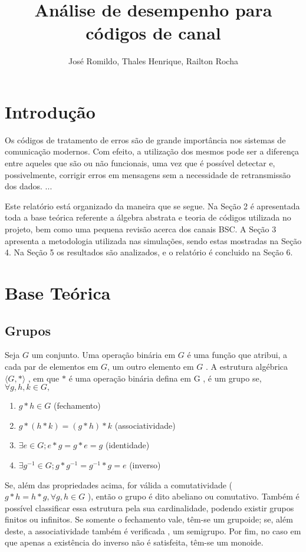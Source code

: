 \documentclass[]{article}
\title{ An{\'a}lise de desempenho para c{\'o}digos de canal}
\author{Jos{\'e} Romildo, Thales Henrique, Railton Rocha}
\begin{document}
\maketitle

\section{Introdução}

\par
Os códigos de tratamento de erros são de grande importância nos sistemas de comunicação modernos. Com efeito, a utilização dos mesmos pode ser a diferença entre aqueles que são ou não funcionais, uma vez que é possível detectar e, possivelmente, corrigir erros em mensagens sem a necessidade de retransmissão dos dados. 
...

Este relatório está organizado da maneira que se segue. Na Seção 2 é apresentada toda a base teórica referente a álgebra abstrata e teoria de códigos utilizada no projeto, bem como uma pequena revisão acerca dos canais BSC. A Seção 3 apresenta a metodologia utilizada nas simulações, sendo estas mostradas na Seção 4. Na Seção 5 os resultados são analizados, e o relatório é concluido na Seção 6.



\section{Base Teórica}
\subsection{Grupos}

Seja $G$ um conjunto. Uma operação binária em $G$ é uma função que atribui, a cada par de elementos em $G$, um outro elemento em $G$ . A estrutura algébrica  $\langle G , * \rangle$ , em que $*$ é uma operação binária defina em G , é um grupo se, $\forall g , h , k \in G,$

\begin{enumerate}[G1.]
	\item $g * h \in G$ (fechamento)
	\item $ g * (h * k) = (g*h)*k$ (associatividade)
	\item $ \exists e \in G ; e * g = g * e = g $ (identidade)
	\item $ \exists g^{-1} \in G;  g*g^{-1} = g^{-1} *g=e $ (inverso)
\end{enumerate}

Se, além das propriedades acima, for válida a comutatividade ( $ g*h = h*g , \forall g , h \in G$ ), então o grupo é dito abeliano ou comutativo. Também é possível classificar essa estrutura pela sua cardinalidade, podendo existir grupos finitos ou infinitos.
Se somente o fechamento vale, têm-se um grupoide; se, além deste, a associatividade também é verificada , um semigrupo. Por fim, no caso em que apenas a existência do inverso não é satisfeita, têm-se um monoide.
\end{document}
